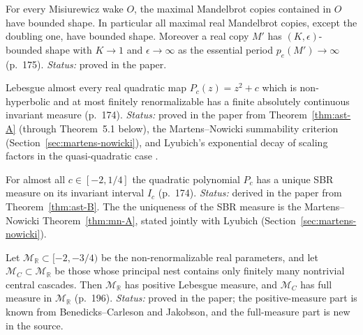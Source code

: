 \begin{theorem}
\label{thm:ast-C}
For every Misiurewicz wake $O$, the maximal Mandelbrot copies contained in $O$ have bounded shape.  In particular all maximal
real Mandelbrot copies, except the doubling one, have bounded shape.  Moreover a real copy $M'$ has $(K,\epsilon)$-bounded shape
with $K\to1$ and $\epsilon\to\infty$ as the essential period $p_e(M')\to\infty$ (p.~175).
\emph{Status:} proved in the paper.
\end{theorem}

\begin{theorem}
\label{thm:ast-B}
Lebesgue almost every real quadratic map $P_c(z)=z^2+c$ which is non-hyperbolic and at most finitely renormalizable has a
finite absolutely continuous invariant measure (p.~174).  \emph{Status:} proved in the paper
from Theorem~\ref{thm:ast-A} (through Theorem~5.1 below), the Martens--Nowicki summability criterion (Section~\ref{sec:martens-nowicki}), and Lyubich's exponential
decay of scaling factors in the quasi-quadratic case \cite{LyubichQuasiQuadratic}.
\end{theorem}

\begin{corollary}
\label{cor:ast-sbr}
For almost all $c\in[-2,1/4]$ the quadratic polynomial $P_c$ has a unique SBR measure on its invariant interval $I_c$
(p.~174).  \emph{Status:} derived in the paper from Theorem~\ref{thm:ast-B}.  The
the uniqueness of the SBR measure is the Martens--Nowicki Theorem~\ref{thm:mn-A}, stated jointly with Lyubich (Section~\ref{sec:martens-nowicki}).
\end{corollary}

\begin{theorem}
\label{thm:ast-5-1}
Let $\mathcal M_{\mathbb R}\subset[-2,-3/4)$ be the non-renormalizable real parameters, and let $\mathcal M_C\subset\mathcal M_{\mathbb R}$
be those whose principal nest contains only finitely many nontrivial central cascades.  Then $\mathcal M_{\mathbb R}$ has positive
Lebesgue measure, and $\mathcal M_C$ has full measure in $\mathcal M_{\mathbb R}$ (p.~196).
\emph{Status:} proved in the paper; the positive-measure part is known from Benedicks--Carleson and Jakobson, and the full-measure
part is new in the source.
\end{theorem}

